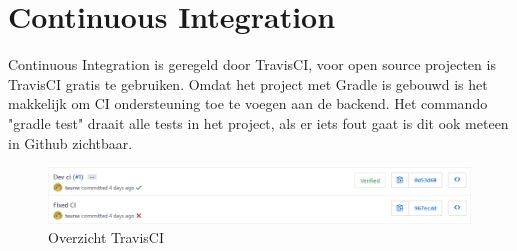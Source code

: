 \chapter{Continuous Integration}
Continuous Integration is geregeld door TravisCI, voor open source projecten is TravisCI gratis te gebruiken.
Omdat het project met Gradle is gebouwd is het makkelijk om CI ondersteuning toe te voegen aan de backend.
Het commando "gradle test" draait alle tests in het project, als er iets fout gaat is dit ook meteen in Github zichtbaar.

	\begin{figure}[H]
	\includegraphics[width=\textwidth]{images/TravisCi.png}
	\caption{Overzicht TravisCI}
	\label{fig:TravisCI}
\end{figure}